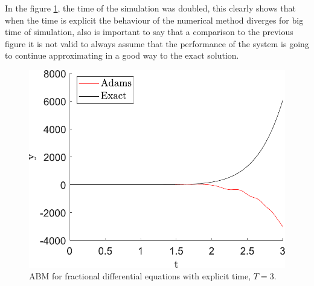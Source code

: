In the figure \ref{fig:adam_disp2}, the time of the simulation was doubled, this clearly shows that when the time is explicit the behaviour of the numerical method diverges for big time of simulation, also is important to say that a comparison to the previous figure it is not valid to always assume that the performance of the system is going to continue approximating in a good way to the exact solution.

\begin{figure}[H]
    \centering
    \includegraphics[scale=0.5]{files/adams_dispersion_2.pdf}
    \caption{ABM for fractional differential equations with explicit time, $T=3$.}
    \label{fig:adam_disp2}
\end{figure}

